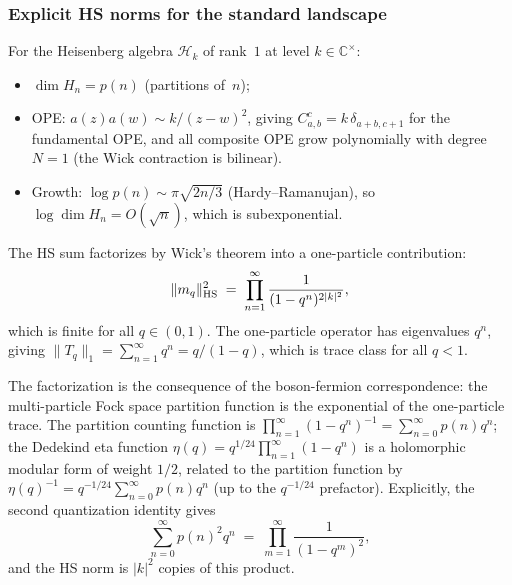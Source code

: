 \subsubsection{Explicit HS norms for the standard landscape}

\begin{computation}
\label{comp:thqg-I-hs-heisenberg}
For the Heisenberg algebra $\mathcal{H}_k$ of rank~$1$ at level $k \in \mathbb{C}^{\times}$:
\begin{itemize}
\item $\dim H_n = p(n)$ (partitions of~$n$);
\item OPE: $a(z)a(w) \sim k/(z-w)^2$, giving $C^c_{a,b} = k\,\delta_{a+b,c+1}$ for the fundamental OPE, and all composite OPE grow polynomially with degree $N = 1$ (the Wick contraction is bilinear).
\item Growth: $\log p(n) \sim \pi\sqrt{2n/3}$ (Hardy--Ramanujan), so $\log \dim H_n = O(\sqrt{n})$, which is subexponential.
\end{itemize}
The HS sum factorizes by Wick's theorem into a one-particle contribution:
\begin{equation}\label{eq:thqg-I-hs-heisenberg-norm}
\|m_q\|_{\operatorname{HS}}^2 \;=\; \prod_{n=1}^\infty \frac{1}{(1-q^n)^{2|k|^2}},
\end{equation}
which is finite for all $q \in (0,1)$. The one-particle operator has eigenvalues $q^n$, giving $\|T_q\|_1 = \sum_{n=1}^\infty q^n = q/(1-q)$, which is trace class for all $q < 1$.

The factorization is the consequence of the boson-fermion correspondence: the multi-particle Fock space partition function is the exponential of the one-particle trace. The partition counting function is $\prod_{n=1}^\infty (1-q^n)^{-1} = \sum_{n=0}^\infty p(n)q^n$; the Dedekind eta function $\eta(q) = q^{1/24}\prod_{n=1}^\infty (1-q^n)$ is a holomorphic modular form of weight $1/2$, related to the partition function by $\eta(q)^{-1} = q^{-1/24}\sum_{n=0}^\infty p(n)q^n$ (up to the $q^{-1/24}$ prefactor). Explicitly, the second quantization identity gives
\begin{equation}\label{eq:thqg-I-hs-heisenberg-factorization}
\sum_{n=0}^\infty p(n)^2 q^n \;=\; \prod_{m=1}^\infty \frac{1}{(1-q^m)^2},
\end{equation}
and the HS norm is $|k|^2$ copies of this product.
\end{computation}

